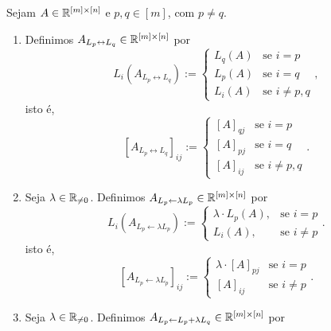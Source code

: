 \begin{definition}
    Sejam $A \in \mathbb{R}^{[m] \times [n]}$ e $p, q \in [m]$, com $p \neq q$.
        \begin{enumerate}[leftmargin=*, align=left, label=\textbf{(\alph*)}]
            \item Definimos $A_{L_p \leftrightarrow L_q} \in \mathbb{R}^{[m] \times [n]}$ por
                \[
                    L_i \left( A_{L_p \leftrightarrow L_q} \right) :=
                        \begin{cases}
                            L_q (A) & \text{se } i = p \\
                            L_p (A) & \text{se } i = q \\
                            L_i (A) & \text{se } i \neq p, q
                        \end{cases},
                \]
            isto é,
                \[
                    [A_{L_p \leftrightarrow L_q}]_{ij} :=
                        \begin{cases}
                            [A]_{qj} & \text{se } i=p \\
                            [A]_{pj} & \text{se } i=q \\
                            [A]_{ij} & \text{se } i \neq p, q
                        \end{cases}.
                \]
            \item Seja $\lambda \in \mathbb{R}_{\neq 0}$. Definimos $A_{L_p \leftarrow \lambda L_p} \in \mathbb{R}^{[m] \times [n]}$ por
                \[
                    L_i \left( A_{L_p \leftarrow \lambda L_p} \right) := 
                        \begin{cases}
                            \lambda \cdot L_p (A), & \text{se } i = p \\
                            L_i (A), & \text{se } i \neq p
                        \end{cases}.
                \]
            isto é,
                \[
                    [A_{L_p \leftarrow \lambda L_p}]_{ij} :=
                        \begin{cases}
                            \lambda \cdot [A]_{pj} & \text{se } i=p \\
                            [A]_{ij} & \text{se } i \neq p
                        \end{cases}.
                \]
            \item Seja $\lambda \in \mathbb{R}_{\neq 0}$. Definimos $A_{L_p \leftarrow L_p + \lambda L_q} \in \mathbb{R}^{[m] \times [n]}$ por

\end{enumerate}
\end{definition}
